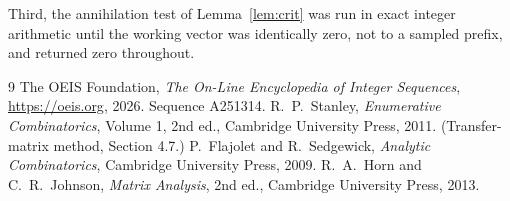 \documentclass[11pt,a4paper]{article}
\theoremstyle{plain}
\theoremstyle{definition}
\begin{document}
Third, the annihilation test of Lemma~\ref{lem:crit} was run in exact integer arithmetic
until the working vector was identically zero, not to a sampled prefix, and returned zero
throughout.

\begin{thebibliography}{9}
 The OEIS Foundation, \emph{The On-Line Encyclopedia of Integer
Sequences}, \url{https://oeis.org}, 2026. Sequence A251314.
 R.~P.~Stanley, \emph{Enumerative Combinatorics}, Volume 1, 2nd ed.,
Cambridge University Press, 2011. (Transfer-matrix method, Section 4.7.)
 P.~Flajolet and R.~Sedgewick, \emph{Analytic Combinatorics}, Cambridge
University Press, 2009.
 R.~A.~Horn and C.~R.~Johnson, \emph{Matrix Analysis}, 2nd ed., Cambridge
University Press, 2013.
\end{thebibliography}
\end{document}
